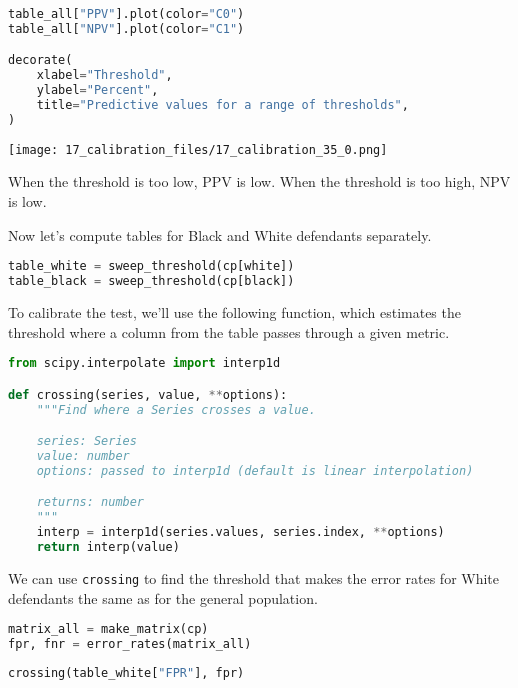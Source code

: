 \begin{lstlisting}[language=Python,style=source]
table_all["PPV"].plot(color="C0")
table_all["NPV"].plot(color="C1")

decorate(
    xlabel="Threshold",
    ylabel="Percent",
    title="Predictive values for a range of thresholds",
)
\end{lstlisting}

\begin{center}
\texttt{[image: 17\_calibration\_files/17\_calibration\_35\_0.png]}
\end{center}

When the threshold is too low, PPV is low. When the threshold is too
high, NPV is low.

Now let's compute tables for Black and White defendants separately.

\begin{lstlisting}[language=Python,style=source]
table_white = sweep_threshold(cp[white])
table_black = sweep_threshold(cp[black])
\end{lstlisting}

To calibrate the test, we'll use the following function, which estimates
the threshold where a column from the table passes through a given
metric.

\pagebreak

\begin{lstlisting}[language=Python,style=source]
from scipy.interpolate import interp1d

def crossing(series, value, **options):
    """Find where a Series crosses a value.

    series: Series
    value: number
    options: passed to interp1d (default is linear interpolation)

    returns: number
    """
    interp = interp1d(series.values, series.index, **options)
    return interp(value)
\end{lstlisting}

We can use \passthrough{\lstinline!crossing!} to find the threshold that
makes the error rates for White defendants the same as for the general
population.

\begin{lstlisting}[language=Python,style=source]
matrix_all = make_matrix(cp)
fpr, fnr = error_rates(matrix_all)
\end{lstlisting}

\begin{lstlisting}[language=Python,style=source]
crossing(table_white["FPR"], fpr)
\end{lstlisting}

